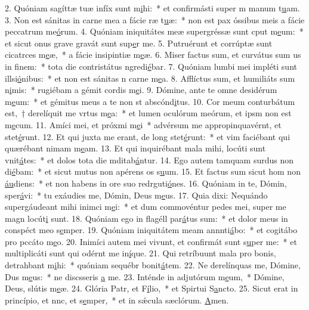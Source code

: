 2. Quóniam sagíttæ tuæ infíx sunt m\uline{i}hi:~* et confirmásti super m manum t\uline{u}am.
3. Non est sánitas in carne mea a fácie ræ t\uline{u}æ:~* non est pax óssibus meis a fácie peccatrum me\uline{ó}rum.
4. Quóniam iniquitátes meæ supergréssæ sunt cput m\uline{e}um:~* et sicut onus grave gravát sunt sup\uline{e}r me.
5. Putruérunt et corrúptæ sunt cicatrces m\uline{e}æ,~* a fácie insipintiæ m\uline{e}æ.
6. Miser factus sum, et curvátus sum us in f\uline{i}nem:~* tota die contristátus ngredi\uline{é}bar.
7. Quóniam lumbi mei impléti sunt illsi\uline{ó}nibus:~* et non est sánitas n carne m\uline{e}a.
8. Afflíctus sum, et humiliáts sum n\uline{i}mis:~* rugiébam a gémit cordis m\uline{e}i.
9. Dómine, ante te omne desidérum m\uline{e}um:~* et gémitus meus a te non st abscónd\uline{i}tus.
10. Cor meum conturbátum est,~† derelíquit me vrtus m\uline{e}a:~* et lumen oculórum meórum, et ipsm non est m\uline{e}cum.
11. Amíci mei, et próxmi m\uline{e}i~* advérsum me appropinquavérnt, et stet\uline{é}runt.
12. Et qui juxta me erant, de long stet\uline{é}runt:~* et vim faciébant qui quærébant nimam m\uline{e}am.
13. Et qui inquirébant mala mihi, locúti sunt vnit\uline{á}tes:~* et dolos tota die mditab\uline{á}ntur.
14. Ego autem tamquam surdus non di\uline{é}bam:~* et sicut mutus non apérens os s\uline{u}um.
15. Et factus sum sicut hom non \uline{áu}diens:~* et non habens in ore suo redrguti\uline{ó}nes.
16. Quóniam in te, Dómin, sper\uline{á}vi:~* tu exáudies me, Dómin, Deus m\uline{e}us.
17. Quia dixi: Nequándo supergáudeant mihi inimci m\uline{e}i:~* et dum commovéntur pedes mei, super me magn locút\uline{i} sunt.
18. Quóniam ego in flagéll par\uline{á}tus sum:~* et dolor meus in conspéct meo s\uline{e}mper.
19. Quóniam iniquitátem meam annnti\uline{á}bo:~* et cogitábo pro pccáto m\uline{e}o.
20. Inimíci autem mei vivunt, et confirmát sunt s\uline{u}per me:~* et multiplicáti sunt qui odérnt me in\uline{í}que.
21. Qui retríbuunt mala pro bonis, detrahbant m\uline{i}hi:~* quóniam sequébr bonit\uline{á}tem.
22. Ne derelínquas me, Dómine, Dus m\uline{e}us:~* ne discsseris \uline{a} me.
23. Inténde in adjutórum m\uline{e}um,~* Dómine, Deus, slútis m\uline{e}æ.
24. Glória Patr, et F\uline{í}lio,~* et Spirtui S\uline{a}ncto.
25. Sicut erat in princípio, et nnc, et s\uline{e}mper,~* et in sǽcula sæclórum. \uline{A}men.
